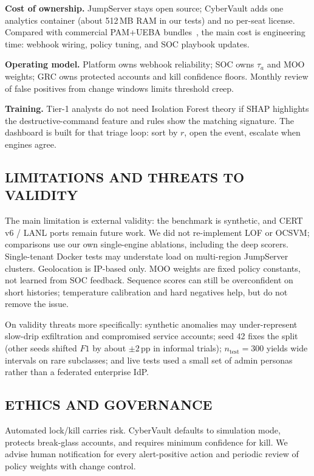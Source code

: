 \documentclass{ieeeaccess}
\begin{document}
\textbf{Cost of ownership.} JumpServer stays open source; CyberVault adds one analytics container (about 512\,MB RAM in our tests) and no per-seat license. Compared with commercial PAM+UEBA bundles~\cite{ref4,ref16}, the main cost is engineering time: webhook wiring, policy tuning, and SOC playbook updates.

\textbf{Operating model.} Platform owns webhook reliability; SOC owns $\tau_a$ and MOO weights; GRC owns protected accounts and kill confidence floors. Monthly review of false positives from change windows limits threshold creep.

\textbf{Training.} Tier-1 analysts do not need Isolation Forest theory if SHAP highlights the destructive-command feature and rules show the matching signature. The dashboard is built for that triage loop: sort by $r$, open the event, escalate when engines agree.

\subsection{LIMITATIONS AND THREATS TO VALIDITY}
The main limitation is external validity: the benchmark is synthetic, and CERT v6 / LANL ports remain future work. We did not re-implement LOF or OCSVM; comparisons use our own single-engine ablations, including the deep scorers. Single-tenant Docker tests may understate load on multi-region JumpServer clusters. Geolocation is IP-based only. MOO weights are fixed policy constants, not learned from SOC feedback. Sequence scores can still be overconfident on short histories; temperature calibration and hard negatives help, but do not remove the issue.

On validity threats more specifically: synthetic anomalies may under-represent slow-drip exfiltration and compromised service accounts; seed 42 fixes the split (other seeds shifted $F1$ by about $\pm 2$\,pp in informal trials); $n_{\mathrm{test}}=300$ yields wide intervals on rare subclasses; and live tests used a small set of admin personas rather than a federated enterprise IdP.

\subsection{ETHICS AND GOVERNANCE}
Automated lock/kill carries risk. CyberVault defaults to simulation mode, protects break-glass accounts, and requires minimum confidence for kill. We advise human notification for every alert-positive action and periodic review of policy weights with change control.
\end{document}
